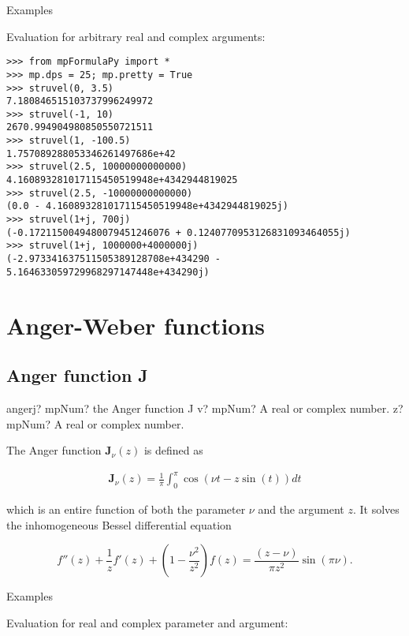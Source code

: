 Examples

Evaluation for arbitrary real and complex arguments:

\begin{lstlisting}
>>> from mpFormulaPy import *
>>> mp.dps = 25; mp.pretty = True
>>> struvel(0, 3.5)
7.180846515103737996249972
>>> struvel(-1, 10)
2670.994904980850550721511
>>> struvel(1, -100.5)
1.757089288053346261497686e+42
>>> struvel(2.5, 10000000000000)
4.160893281017115450519948e+4342944819025
>>> struvel(2.5, -10000000000000)
(0.0 - 4.160893281017115450519948e+4342944819025j)
>>> struvel(1+j, 700j)
(-0.1721150049480079451246076 + 0.1240770953126831093464055j)
>>> struvel(1+j, 1000000+4000000j)
(-2.973341637511505389128708e+434290 - 5.164633059729968297147448e+434290j)
\end{lstlisting}



\newpage
\section{Anger-Weber functions}


\subsection{Anger function J}

\begin{mpFunctionsExtract}
	\mpFunctionTwo
	{angerj? mpNum? the Anger function J}
	{v? mpNum? A real or complex number.}
	{z? mpNum? A real or complex number.}	
\end{mpFunctionsExtract}


\vpara
The Anger function $\textbf{J}_{\nu}(z)$ is defined as

\begin{eqnarray}
\textbf{J}_{\nu}(z) = \frac{1}{\pi} \int_0^{\pi} \cos(\nu t - z \sin(t)) dt
\end{eqnarray}

which is an entire function of both the parameter $\nu$ and the argument $z$. It solves the inhomogeneous Bessel differential equation

\begin{equation}
f''(z)+\frac{1}{z} f'(z) + \left(1-\frac{\nu^2}{z^2} \right)f(z) = \frac{(z-\nu)}{\pi z^2} \sin(\pi\nu).
\end{equation}

Examples

Evaluation for real and complex parameter and argument:

